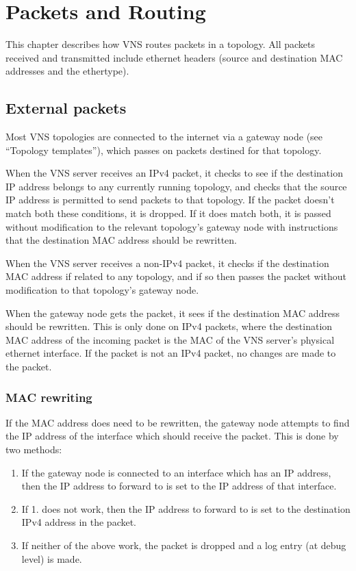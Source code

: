 \documentclass[a4paper,12pt]{report}
\begin{document}
\chapter{Packets and Routing}
This chapter describes how VNS routes packets in a topology.  All packets received and transmitted include ethernet headers (source and destination MAC addresses and the ethertype).

\section{External packets}
Most VNS topologies are connected to the internet via a gateway node (see ``Topology templates''), which passes on packets destined for that topology.

When the VNS server receives an IPv4 packet, it checks to see if the destination IP address belongs to any currently running topology, and checks that the source IP address is permitted to send packets to that topology.  If the packet doesn't match both these conditions, it is dropped.  If it does match both, it is passed without modification to the relevant topology's gateway node with instructions that the destination MAC address should be rewritten.

When the VNS server receives a non-IPv4 packet, it checks if the destination MAC address if related to any topology, and if so then passes the packet without modification to that topology's gateway node.

When the gateway node gets the packet, it sees if the destination MAC address should be rewritten.  This is only done on IPv4 packets, where the destination MAC address of the incoming packet is the MAC of the VNS server's physical ethernet interface.  If the packet is not an IPv4 packet, no changes are made to the packet.

\subsection{MAC rewriting}
If the MAC address does need to be rewritten, the gateway node attempts to find the IP address of the interface which should receive the packet.  This is done by two methods:
\begin{enumerate}
\item If the gateway node is connected to an interface which has an IP address, then the IP address to forward to is set to the IP address of that interface.
\item If 1. does not work, then the IP address to forward to is set to the destination IPv4 address in the packet.
\item If neither of the above work, the packet is dropped and a log entry (at debug level) is made.
\end{enumerate}
\end{document}
